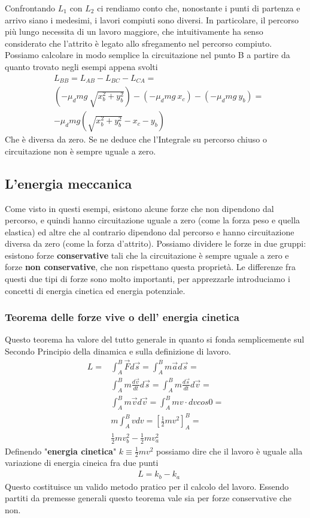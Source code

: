 \documentclass[10pt,a4paper]{article}
\begin{document}
Confrontando $L_1$ con $L_2$ ci rendiamo conto che, nonostante i punti di partenza e arrivo siano i medesimi, i lavori compiuti sono diversi. In particolare, il percorso più lungo necessita di un lavoro maggiore, che intuitivamente ha senso considerato che l'attrito è legato allo sfregamento nel percorso compiuto. Possiamo calcolare in modo semplice la circuitazione nel punto B a partire da quanto trovato negli esempi appena svolti
\begin{align*}
&L_{BB} = L_{AB}-L_{BC}-L_{CA}=\\
&(-\mu_d mg\ \sqrt{x_b^2+y_b^2}) - (-\mu_d mg\ x_c) - (-\mu_d mg\ y_b)=\\
&-\mu_d mg(\sqrt{x_b^2+y_b^2}-x_c-y_b)
\end{align*}
Che è diversa da zero. Se ne deduce che l'Integrale su percorso chiuso o circuitazione non è sempre uguale a zero.
\subsection{L'energia meccanica}
Come visto in questi esempi, esistono alcune forze che non dipendono dal percorso, e quindi hanno circuitazione uguale a zero (come la forza peso e quella elastica) ed altre che al contrario dipendono dal percorso e hanno circuitazione diversa da zero (come la forza d'attrito). Possiamo dividere le forze in due gruppi: esistono forze \textbf{conservative} tali che la circuitazione è sempre uguale a zero e forze \textbf{non conservative}, che non rispettano questa proprietà. Le differenze fra questi due tipi di forze sono molto importanti, per apprezzarle introduciamo i concetti di energia cinetica ed energia potenziale.
\subsubsection{Teorema delle forze vive o dell' energia cinetica}
Questo teorema ha valore del tutto generale in quanto si fonda semplicemente sul Secondo Principio della dinamica e sulla definizione di lavoro.
\begin{align*}
	L =& \int_{A}^{B}\vec{F} d\vec{s}= \int_{A}^{B}m\vec{a} d\vec{s}=\\
	&\int_{A}^{B}m\frac{d\vec{v}}{dt} d\vec{s}=\int_{A}^{B}m\frac{d\vec{s}}{dt} d\vec{v}=\\
	&\int_{A}^{B}m\vec{v} d\vec{v}=\int_{A}^{B}m v\cdot dv cos0=\\
	&m\int_{A}^{B} v dv=[\frac{1}{2}mv^2]_{A}^{B}=\\
	&\frac{1}{2}mv_b^2-\frac{1}{2}mv_a^2
\end{align*}
Definendo "\textbf{energia cinetica}" $k \equiv \frac{1}{2}mv^2$ possiamo dire che il lavoro è uguale alla variazione di energia cineica fra due punti
\begin{align*}
	&L = k_b -k_a
\end{align*}
Questo costituisce un valido metodo pratico per il calcolo del lavoro. Essendo partiti da premesse generali questo teorema vale sia per forze conservative che non.
\end{document}
